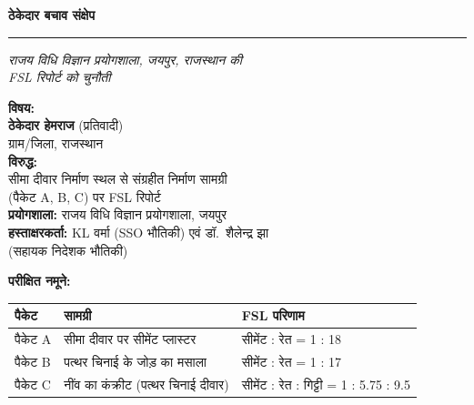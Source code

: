 \documentclass[12pt, a4paper]{article}
\begin{document}

\begin{titlepage}
  \centering
  \vspace*{1cm}
  {\Huge\bfseries\color{navy} ठेकेदार बचाव संक्षेप\par}
  \vspace{0.3cm}
  {\Large\color{gold} \rule{0.7\linewidth}{1pt}\par}
  \vspace{0.4cm}
  {\large\itshape राजय विधि विज्ञान प्रयोगशाला, जयपुर, राजस्थान की\\
  FSL रिपोर्ट को चुनौती\par}
  \vspace{0.8cm}

  \begin{mdframed}[linecolor=navy, linewidth=1.5pt, backgroundcolor=lightblue]
    \centering
    \textbf{विषय:}\\[6pt]
    \large\textbf{ठेकेदार हेमराज} (प्रतिवादी)\\
    \normalsize ग्राम/जिला, राजस्थान\\[10pt]
    \textbf{विरुद्ध:}\\[6pt]
    सीमा दीवार निर्माण स्थल से संग्रहीत निर्माण सामग्री\\
    (पैकेट A, B, C) पर FSL रिपोर्ट\\[10pt]
    \textbf{प्रयोगशाला:} राजय विधि विज्ञान प्रयोगशाला, जयपुर\\
    \textbf{हस्ताक्षरकर्ता:} KL वर्मा (SSO भौतिकी) एवं डॉ.\ शैलेन्द्र झा\\
    (सहायक निदेशक भौतिकी)
  \end{mdframed}

  \vspace{0.8cm}
  \textbf{परीक्षित नमूने:}

  \begin{center}
  \begin{tabular}{|l|l|l|}
    \hline
    \textbf{पैकेट} & \textbf{सामग्री} & \textbf{FSL परिणाम} \\
    \hline
    पैकेट A & सीमा दीवार पर सीमेंट प्लास्टर & सीमेंट : रेत = 1 : 18 \\
    पैकेट B & पत्थर चिनाई के जोड़ का मसाला & सीमेंट : रेत = 1 : 17 \\
    पैकेट C & नींव का कंक्रीट (पत्थर चिनाई दीवार) & सीमेंट : रेत : गिट्टी = 1 : 5.75 : 9.5 \\
    \hline
  \end{tabular}
  \end{center}


\end{titlepage}
\end{document}
